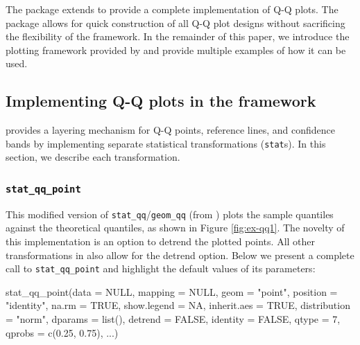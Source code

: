 The  package extends  to provide a complete
implementation of Q-Q plots. The package allows for quick construction
of all Q-Q plot designs without sacrificing the flexibility of the
 framework. In the remainder of this paper, we introduce
the plotting framework provided by  and provide multiple
examples of how it can be used.

\subsection{\texorpdfstring{Implementing Q-Q plots in the 
framework}{Implementing Q-Q plots in the  framework}}\label{implementing-q-q-plots-in-the-framework}

\label{sec:implementing}

 provides a  layering mechanism for Q-Q
points, reference lines, and confidence bands by implementing separate
statistical transformations (\texttt{stat}s). In this section, we
describe each transformation.

\subsubsection{\texorpdfstring{\texttt{stat\_qq\_point}}{stat\_qq\_point}}\label{stat_qq_point}

This modified version of \texttt{stat\_qq}/\texttt{geom\_qq} (from
) plots the sample quantiles against the theoretical
quantiles, as shown in Figure \ref{fig:ex-qq1}. The novelty of this
implementation is an option to detrend the plotted points. All other
transformations in  also allow for the detrend option.
Below we present a complete call to \texttt{stat\_qq\_point} and
highlight the default values of its parameters:

\begin{Schunk}
\begin{Sinput}
stat_qq_point(data = NULL,
              mapping = NULL,
              geom = "point",
              position = "identity",
              na.rm = TRUE,
              show.legend = NA,
              inherit.aes = TRUE,
              distribution = "norm",
              dparams = list(),
              detrend = FALSE,
              identity = FALSE,
              qtype = 7,
              qprobs = c(0.25, 0.75),
              ...)
\end{Sinput}
\end{Schunk}


